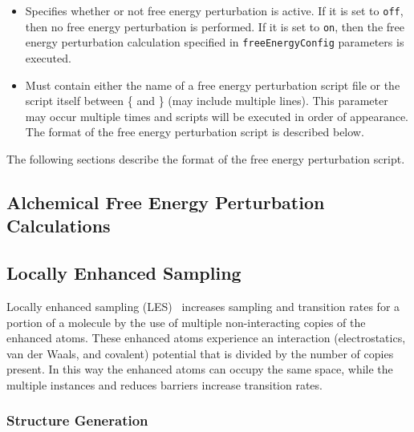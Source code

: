 \begin{itemize}

\item
{}
{Specifies whether or not free energy perturbation is active.  If it 
is set to {\tt off}, then no free energy perturbation is performed.  
If it is set to {\tt on}, then the free energy perturbation calculation specified in
{\tt freeEnergyConfig} parameters is executed.}

\item
{}
{Must contain either the name of a free energy perturbation script file or the script 
itself between \{ and \} (may include multiple lines).
This parameter may occur multiple times and scripts will be executed
in order of appearance.
The format of the free energy perturbation script is described below.
}

\end{itemize}

The following sections describe the format of the free energy perturbation script.


\subsection{Alchemical Free Energy Perturbation Calculations}
\label{section:alchemy}


\subsection{Locally Enhanced Sampling}
\label{section:les}

Locally enhanced sampling (LES)~\cite{ROIT91,SIMM98,SIMM00} increases
sampling and transition rates for a portion of a molecule by the use of
multiple non-interacting copies of the enhanced atoms.  These enhanced
atoms experience an interaction (electrostatics, van der Waals, and
covalent) potential that is divided by the number of copies present.
In this way the enhanced atoms can occupy the same space, while the
multiple instances and reduces barriers increase transition rates.

\subsubsection{Structure Generation}


